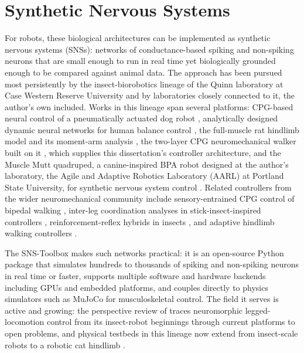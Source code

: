 \section{Synthetic Nervous Systems}\label{sec:bg_sns}

For robots, these biological architectures can be implemented as synthetic nervous systems (SNSs): networks of conductance-based spiking and non-spiking neurons that are small enough to run in real time yet biologically grounded enough to be compared against animal data. The approach has been pursued most persistently by the insect-biorobotics lineage of the Quinn laboratory at Case Western Reserve University and by laboratories closely connected to it, the author's own included. Works in this lineage span several platforms: CPG-based neural control of a pneumatically actuated dog robot \citep{hunt_development_2017}, analytically designed dynamic neural networks for human balance control \citep{hilts_dynamic_2019}, the full-muscle rat hindlimb model and its moment-arm analysis \citep{young_analyzing_2019}, the two-layer CPG neuromechanical walker built on it \citep{deng_neuromechanical_2019}, which supplies this dissertation's controller architecture, and the Muscle Mutt quadruped, a canine-inspired BPA robot designed at the author's laboratory, the Agile and Adaptive Robotics Laboratory (AARL) at Portland State University, for synthetic nervous system control \citep{scharzenberger_design_2019}. Related controllers from the wider neuromechanical community include sensory-entrained CPG control of bipedal walking \citep{li_bipedal_2017}, inter-leg coordination analyses in stick-insect-inspired controllers \citep{nourse_analyzing_2019}, reinforcement-reflex hybrids in insects \citep{goldsmith_investigating_2021}, and adaptive hindlimb walking controllers \citep{schilling_adaptive_2022}.

The SNS-Toolbox \citep{nourse_sns_2023} makes such networks practical: it is an open-source Python package that simulates hundreds to thousands of spiking and non-spiking neurons in real time or faster, supports multiple software and hardware backends including GPUs and embedded platforms, and couples directly to physics simulators such as MuJoCo for musculoskeletal control. The field it serves is active and growing: the perspective review of \citet{szczecinski_perspective_2023} traces neuromorphic legged-locomotion control from its insect-robot beginnings through current platforms to open problems, and physical testbeds in this lineage now extend from insect-scale robots to a robotic cat hindlimb \citep{armstead_design_2025}.


